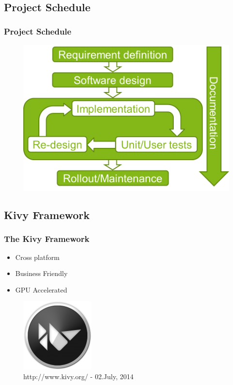 \documentclass[9pt]{beamer}
\begin{document}
	
		\subsection{Project Schedule}
			\begin{frame}
				\frametitle{Project Schedule}
				\begin{figure}
					\centering
					\includegraphics[scale=0.25]{Images/project_schedule.png}
				\end{figure}
			\end{frame}
			
		\subsection{Kivy Framework}
			\begin{frame}
				\frametitle{The Kivy Framework}
				\begin{itemize}
					\item Cross platform
					\item Business Friendly
					\item GPU Accelerated
				\end{itemize}
				
				\begin{figure}
					\centering				
					\includegraphics[scale=0.3]{Images/kivy_logo.png}
					\caption{http://www.kivy.org/ - 02.July, 2014}
				\end{figure}
			\end{frame}
			
\end{document}
